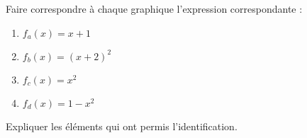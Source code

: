 
\begin{exercice}\label{exosmath-0252}

\let\Oldtheenumi\theenumi
\renewcommand{\theenumi}{(\alph{enumi})}
    Faire correspondre à chaque graphique l'expression correspondante :
    \begin{multicols}{2}
        \begin{enumerate}
            \item
                \( f_a(x)=x+1\)
            \item
                \( f_b(x)=(x+2)^2\)
            \item
                $f_c(x)=x^2$
            \item
                \( f_d(x)=1-x^2\)
        \end{enumerate}
    \end{multicols}
\let\theenumi\Oldtheenumi

\begin{center}
    
\end{center}

    Expliquer les éléments qui ont permis l'identification.

\end{exercice}
